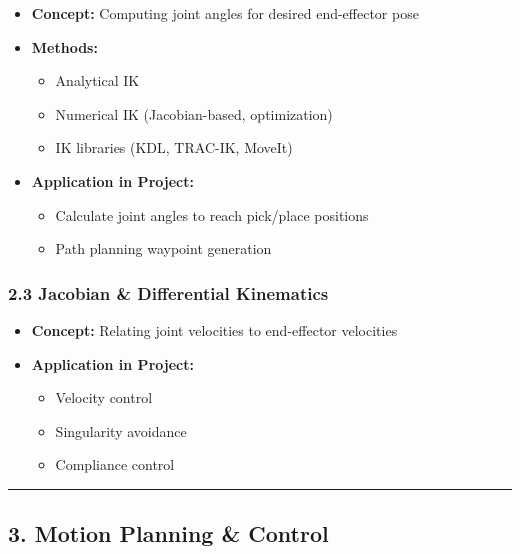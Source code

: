 \documentclass[
]{article}
\providecommand{\tightlist}{%
  \setlength{\itemsep}{0pt}\setlength{\parskip}{0pt}}
\begin{document}
\begin{itemize}
\tightlist
\item
  \textbf{Concept:} Computing joint angles for desired end-effector pose
\item
  \textbf{Methods:}

  \begin{itemize}
  \tightlist
  \item
    Analytical IK
  \item
    Numerical IK (Jacobian-based, optimization)
  \item
    IK libraries (KDL, TRAC-IK, MoveIt)
  \end{itemize}
\item
  \textbf{Application in Project:}

  \begin{itemize}
  \tightlist
  \item
    Calculate joint angles to reach pick/place positions
  \item
    Path planning waypoint generation
  \end{itemize}
\end{itemize}

\hypertarget{jacobian-differential-kinematics}{%
\subsubsection{2.3 Jacobian \& Differential
Kinematics}\label{jacobian-differential-kinematics}}

\begin{itemize}
\tightlist
\item
  \textbf{Concept:} Relating joint velocities to end-effector velocities
\item
  \textbf{Application in Project:}

  \begin{itemize}
  \tightlist
  \item
    Velocity control
  \item
    Singularity avoidance
  \item
    Compliance control
  \end{itemize}
\end{itemize}

\begin{center}\rule{0.5\linewidth}{0.5pt}\end{center}

\hypertarget{motion-planning-control}{%
\subsection{3. Motion Planning \&
Control}\label{motion-planning-control}}
\end{document}
